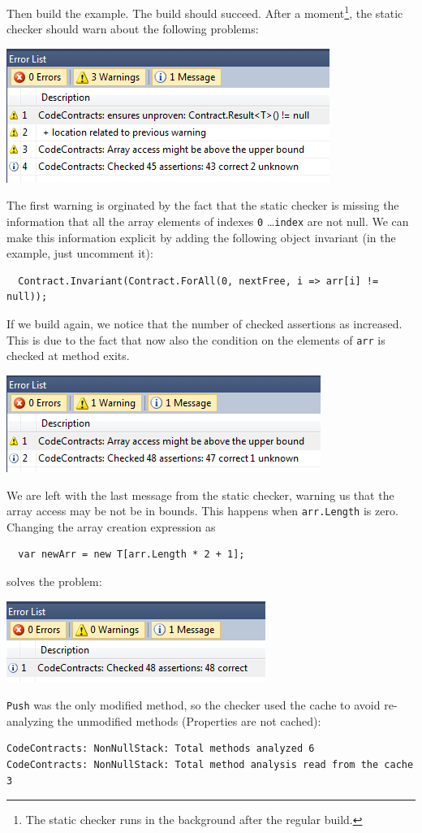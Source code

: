 \documentclass{article}
\newcommand{\code}[1]{\lstinline{#1}}
\begin{document}
Then build the example. The build should succeed. After a
moment\footnote{The static checker runs in the background after the regular build.}, 
the static checker should warn about the following problems:
\begin{center}
  \includegraphics[width=1\columnwidth]{ex2.png}
\end{center}
The first warning is orginated by the fact that the static checker is missing the information that all the array elements of indexes \code{0} \dots \code{index} are not null.
We can make this information explicit  by adding the following object invariant (in the example, just uncomment it):
\begin{lstlisting}
  Contract.Invariant(Contract.ForAll(0, nextFree, i => arr[i] != null));
\end{lstlisting}
If we build again, we notice that the number of checked assertions as increased.
This is due to the fact that now also the condition on the elements of \code{arr} is checked at method exits.
\begin{center}
  \includegraphics[width=1\columnwidth]{ex3.png}
\end{center}
We are left with the last message from the static checker, warning us that the array access may be not be in bounds.
This happens when \code{arr.Length} is zero.
Changing the array creation expression as 
\begin{lstlisting}
  var newArr = new T[arr.Length * 2 + 1];
\end{lstlisting}
solves the problem:
\begin{center}
  \includegraphics[width=1\columnwidth]{ex4.png}
\end{center}
\code{Push} was the only  modified method, so the checker used the cache to avoid re-analyzing the unmodified methods (Properties are not cached):

\begin{verbatim}
CodeContracts: NonNullStack: Total methods analyzed 6
CodeContracts: NonNullStack: Total method analysis read from the cache 3
\end{verbatim}
\end{document}
